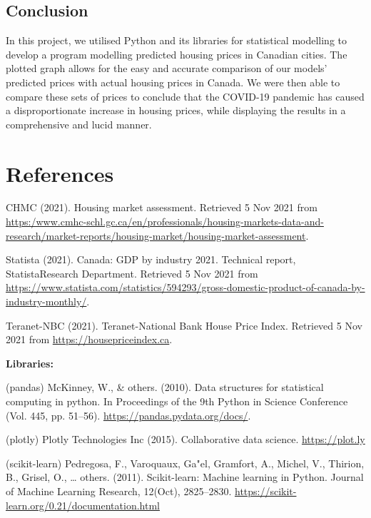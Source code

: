 \documentclass{article}
\begin{document}
\subsection{Conclusion}

In this project, we utilised Python and its libraries for statistical modelling to develop a program modelling predicted housing prices in Canadian cities. The plotted graph allows for the easy and accurate comparison of our models' predicted prices with actual housing prices in Canada. We were then able to compare these sets of prices to conclude that the COVID-19 pandemic has caused a disproportionate increase in housing prices, while displaying the results in a comprehensive and lucid manner.


\section{References}

CHMC (2021). Housing market assessment. Retrieved 5 Nov 2021 from \url{https:/www.cmhc-schl.gc.ca/en/professionals/housing-markets-data-and-research/market-reports/housing-market/housing-market-assessment}.

Statista  (2021).   Canada:  GDP  by  industry  2021.   Technical  report,  StatistaResearch Department. Retrieved 5 Nov 2021 from \url{https://www.statista.com/statistics/594293/gross-domestic-product-of-canada-by-industry-monthly/}.

Teranet-NBC (2021).  Teranet-National Bank House Price Index.  Retrieved 5 Nov 2021 from \url{https://housepriceindex.ca}.


\textbf{Libraries:}

(pandas)
McKinney, W., \& others. (2010). Data structures for statistical computing in python. In Proceedings of the 9th Python in Science Conference (Vol. 445, pp. 51–56). \url{https://pandas.pydata.org/docs/}.

(plotly)
Plotly Technologies Inc (2015). Collaborative data science. \url{https://plot.ly}

(scikit-learn)
Pedregosa, F., Varoquaux, Ga"el, Gramfort, A., Michel, V., Thirion, B., Grisel, O., … others. (2011). Scikit-learn: Machine learning in Python. Journal of Machine Learning Research, 12(Oct), 2825–2830.
\url{https://scikit-learn.org/0.21/documentation.html}
\end{document}
